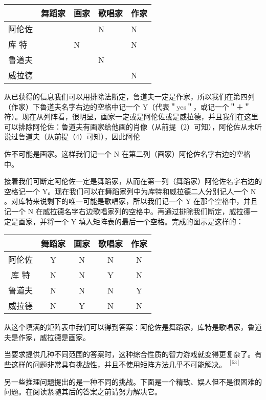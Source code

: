 \begin{center}
\begin{tabular}{|l|l|l|l|l|}
\hline
 & 舞蹈家 & 画家 & 歌唱家 & 作家 \\
\hline
阿伦佐 &  &  & N & N \\
\hline
库 特 &  & N &  & N \\
\hline
鲁道夫 &  &  & N &  \\
\hline
威拉德 &  &  &  & N \\
\hline
\end{tabular}
\end{center}

从已获得的信息我们可以用排除法断定，鲁道夫一定是作家，所以我们在第四列（作家）下鲁道夫名字右边的空格中记一个 Y（代表＂yes＂，或记一个＂＋＂符）。现在从列阵看，很明显，画家一定或是阿伦佐或是威拉德，并且我们在这里可以排除阿伦佐：鲁道夫有画家给他画的肖像（从前提（2）可知），阿伦佐从未听说过鲁道夫（从前提（4）可知），因此阿伦

佐不可能是画家。这样我们记一个 N 在第二列（画家）阿伦佐名字右边的空格中。

接着我们可断定阿伦佐一定是舞蹈家，从而在第一列（舞蹈家）阿伦佐名字右边的空格记一个 Y。现在我们可以在舞蹈家列中为库特和威拉德二人分别记人一个 N 。对库特来说剩下的唯一可能是歌唱家，所以我们记一个 Y 在那个空格中，并且记一个 N 在威拉德名字右边歌唱家列的空格中。再通过排除我们断定，威拉德一定是画家，并将一个 Y 填入矩阵表的最后一个空格。完成的图示是这样的：

\begin{center}
\begin{tabular}{|c|c|c|c|c|}
\hline
 & 舞蹈家 & 画家 & 歌唱家 & 作家 \\
\hline
阿伦佐 & Y & N & N & N \\
\hline
库 特 & N & N & Y & N \\
\hline
鲁道夫 & N & N & N & Y \\
\hline
威拉德 & N & Y & N & N \\
\hline
\end{tabular}
\end{center}

从这个填满的矩阵表中我们可以得到答案：阿伦佐是舞蹈家，库特是歌唱家，鲁道夫是作家，威拉德是画家。

当要求提供几种不同范围的答案时，这种综合性质的智力游戏就变得更复杂了。有些这样的问题非常具有挑战性，并且不使用矩阵方法几乎不可能解决。 ${ }^{[53]}$

另一些推理问题提出的是一种不同的挑战。下面是一个精致、娱人但不是很困难的问题。在阅读紧随其后的答案之前请努力解决它。

